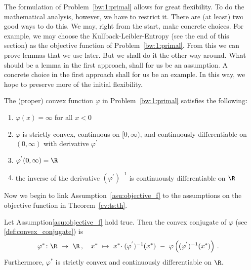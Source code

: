 The formulation of Problem~\ref{bw:1:primal} allows for
great flexibility.
To do the mathematical analysis, however, we have to restrict it.
There are (at least) two good ways to do this.
We may, right from the start,
make concrete choices.
For example, we may choose the Kullback-Leibler-Entropy (see the end of this section) as the objective function of Problem~\ref{bw:1:primal}.
From this we can prove lemmas that we use later.
But we shall do it the other way around.
What should be a lemma in the first approach, shall for us be an assumption.
A concrete choice in the first approach shall for us be an example.
In this way, we hope to preserve more of the initial flexibility.
\newpage
\begin{assumption}
  \label{asu:objective_f}
  The (proper) convex function $\varphi$ in Problem~\ref{bw:1:primal} 
  satisfies the following:
  \begin{enumerate}[label=(\roman*)]
    \item
      $\varphi(x)=\infty$ for all $x<0$
    \item
      $\varphi$ is strictly convex,
      continuous on $[0,\infty)$,
      and continuously differentiable on $(0,\infty)$ with derivative $\varphi^{'}$
    \item
      $\varphi^{'}(0,\infty)=\R$
    \item
      the inverse of the derivative $(\varphi^{'})^{-1}$ is continuously differentiable on $\R$
  \end{enumerate}
\end{assumption}
Now we begin to link
Assumption~\ref{asu:objective_f}
to the assumptions on the objective function in Theorem~\ref{cv:ts:th}.
\begin{lemma}
  \label{1065}
  Let Assumption\ref{asu:objective_f} hold true. Then the convex conjugate of $\varphi$ (see \eqref{def:convex_conjugate}) is
  \begin{gather*}
    \varphi^*
    \colon
    \R
    \ 
    \to
    \ 
    \R
    \,,
    \quad
    x^*
    \ 
    \mapsto
    \ 
    x^*
    \!
    \cdot
    (
    \varphi^{'}
    )^{-1}
    (x^*)
    \ 
    -
    \ 
    \varphi
    \left( 
      (
    \varphi^{'}
    )^{-1}
    (x^*)
    \right)
    \,.
  \end{gather*}
  Furthermore, $\varphi^*$ is strictly convex and continuously differentiable on $\R$.
\end{lemma}
